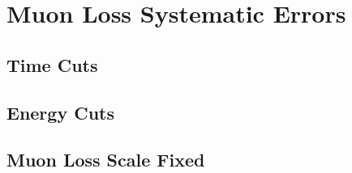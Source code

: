 
\graphicspath{{Body/Figures/MuonLosses/}}

\section{Muon Loss Systematic Errors}

\subsection{Time Cuts}

\subsection{Energy Cuts}

\subsection{Muon Loss Scale Fixed}
